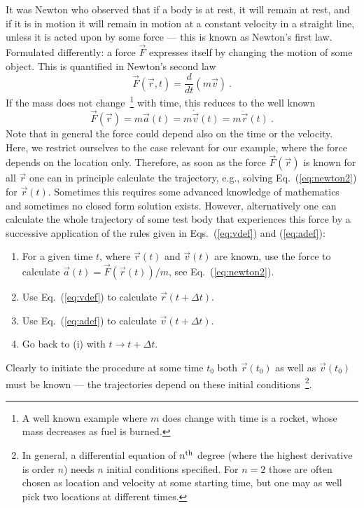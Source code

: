 \documentclass[12pt,ngerman,american]{iopart}
\begin{document}
It was Newton who observed that if a body is at rest, it will remain at rest, and if it is in motion it will remain in motion at a constant velocity in a straight line, unless it is acted upon by some force --- this is known as Newton's first law.
Formulated differently: a force $\vec F$ expresses itself by changing the motion of some object.
This is quantified in Newton's second law
\begin{equation}
\vec F(\vec r, t) = \frac{d}{dt}(m \vec v) \ .
\end{equation}
If the mass does not change~\footnote{%
	A well known example where $m$ does change with time is a rocket, whose mass decreases as fuel is burned.
} with time, this reduces to the well known
\begin{equation}
\vec F(\vec r) = m \vec a(t) = m\dot{\vec v}(t) = m\ddot{\vec{r}}(t) \ . \label{eq:newton2}
\end{equation}
Note that in general the force could depend also on the time or the velocity.
Here, we restrict ourselves to the case relevant for our example, where the force depends on the location only.
Therefore, as soon as the force $\vec F(\vec r)$ is known for all $\vec r$ one can in principle calculate the trajectory, e.g., solving Eq.~(\ref{eq:newton2}) for $\vec r(t)$.
Sometimes this requires some advanced knowledge of mathematics and sometimes no closed form solution exists.
However, alternatively one can calculate the whole trajectory of some test body that experiences this force by a successive application of the rules given in Eqs.~(\ref{eq:vdef}) and (\ref{eq:adef}):
\begin{enumerate}
\item For a given time $t$, where $\vec r(t)$ and $\vec v(t)$ are known, use the force to calculate $\vec a(t) = \vec F(\vec r(t)) / m$, see Eq.~(\ref{eq:newton2}).
\item Use Eq.~(\ref{eq:vdef}) to calculate $\vec r(t+\Delta t)$.
\item Use Eq.~(\ref{eq:adef}) to calculate $\vec v(t+\Delta t)$.
\item Go back to (i) with $t\to t+\Delta t$.
\end{enumerate}
Clearly to initiate the procedure at some time $t_0$ both $\vec r(t_0)$ as well as $\vec v(t_0)$ must be known --- the  trajectories depend on these initial conditions~\footnote{%
	In general, a differential equation of $n^{\rm th}$ degree (where the highest derivative is order $n$) needs $n$ initial conditions specified.
	For $n=2$ those are often chosen as location and velocity at some starting time, but one may as well pick two locations at different times.%
}.
\end{document}
